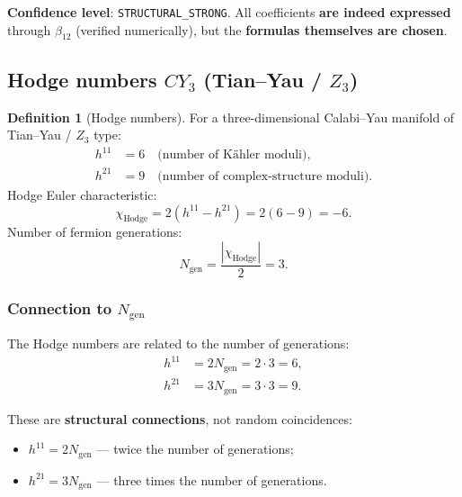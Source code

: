 \documentclass[11pt,a4paper]{article}
\newcommand{\CY}{\ensuremath{CY_3}}
\newcommand{\Ngen}{\ensuremath{N_{\text{gen}}}}
\theoremstyle{definition}
\newtheorem{definition}[theorem]{Definition}
\begin{document}
\medskip\noindent
\textbf{Confidence level}: \texttt{STRUCTURAL\_STRONG}.
All coefficients \textbf{are indeed expressed} through $\beta_{12}$
(verified numerically), but the \textbf{formulas themselves are chosen}.

\subsection{Hodge numbers \texorpdfstring{$\CY$}{CY3} (Tian--Yau / \texorpdfstring{$Z_3$}{Z3})}
\label{subsec:hodge}

\begin{definition}[Hodge numbers]
\label{def:hodge}
For a three-dimensional Calabi--Yau manifold of Tian--Yau / $Z_3$ type:
\begin{align}
    h^{11} &= 6 \quad \text{(number of K\"ahler moduli)}, \\
    h^{21} &= 9 \quad \text{(number of complex-structure moduli)}.
\end{align}
Hodge Euler characteristic:
\begin{equation}
    \chi_{\text{Hodge}} = 2(h^{11} - h^{21}) = 2(6 - 9) = -6.
\end{equation}
Number of fermion generations:
\begin{equation}
    \Ngen = \frac{|\chi_{\text{Hodge}}|}{2} = 3.
\end{equation}
\end{definition}

\subsubsection{Connection to \texorpdfstring{$N_{\text{gen}}$}{N\_gen}}

The Hodge numbers are related to the number of generations:
\begin{align}
    h^{11} &= 2 \Ngen = 2 \cdot 3 = 6, \\
    h^{21} &= 3 \Ngen = 3 \cdot 3 = 9.
\end{align}

These are \textbf{structural connections}, not random coincidences:
\begin{itemize}
    \item $h^{11} = 2 \Ngen$ --- twice the number of generations;
    \item $h^{21} = 3 \Ngen$ --- three times the number of generations.
\end{itemize}
\end{document}
